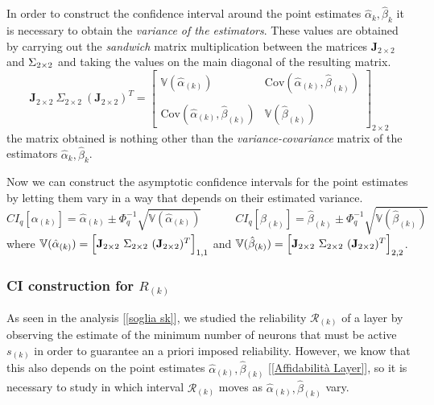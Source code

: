 \documentclass[10pt]{article} %
\begin{document}
In order to construct the confidence interval around the point estimates $\hat{\alpha}_{k}, \hat{\beta}_{k}$ it is necessary to obtain the \textit{variance of the estimators}. These values are obtained by carrying out the \textit{sandwich} matrix multiplication between the matrices $\mathbf{J}_{2\times2}$ and $\large\Sigma_{2\times2}$ and taking the values on the main diagonal of the resulting matrix.
\begin{equation}\label{matriceSandwich}
     \mathbf{J}_{2\times2}\ \Sigma_{2\times2}\ (\mathbf{J}_{2\times2})^{T} =
     \begin{bmatrix}
         \mathbb{V}(\hat{\alpha}_{(k)}) & \text{Cov}(\hat{\alpha}_{(k)}, \hat{\beta}_{(k)}) \\ \\
         \text{Cov}(\hat{\alpha}_{(k)}, \hat{\beta}_{(k)}) & \mathbb{V}(\hat{\beta}_{(k)})
     \end{bmatrix}_{2\times2}
\end{equation}
the matrix obtained is nothing other than the \textit{variance-covariance} matrix of the estimators $\hat{\alpha}_{k}, \hat{\beta}_{k}$. 

Now we can construct the asymptotic confidence intervals for the point estimates by letting them vary in a way that depends on their estimated variance.
\begin{equation}
    CI_{q}[\alpha_{(k)}]
    = \hat{\alpha}_{(k)}\pm \Phi^{-1}_q\sqrt{\mathbb{V}(\hat{\alpha}_{(k)})} \qquad \quad
    CI_{q}[\beta_{(k)}]
    = \hat{\beta}_{(k)}\pm \Phi^{-1}_q\sqrt{\mathbb{V}(\hat{\beta}_{(k)})}
\end{equation}
where $\mathbb{V}(\hat{\alpha}_{(k)}) = \Bigl[\mathbf{J}_{2\times2}\ \Sigma_{2\times2}\ (\mathbf{J}_{2\times2})^{T}\Bigr]_{1,1}$ and $\mathbb{V}(\hat{\beta}_{(k)}) = \Bigl[\mathbf{J}_{2\times2}\ \Sigma_{2\times2}\ (\mathbf{J}_{2\times2})^{T}\Bigr]_{2,2}$.

\subsubsection{CI construction for $R_{(k)}$}
As seen in the analysis [\ref{soglia sk}], we studied the reliability $\mathcal{R}_{(k)}$ of a layer by observing the estimate of the minimum number of neurons that must be active $s_{(k)}$ in order to guarantee an a priori imposed reliability. However, we know that this also depends on the point estimates $\hat{\alpha}_{(k)}, \hat{\beta}_{(k)}$ [\ref{Affidabilità Layer}], so it is necessary to study in which interval $\mathcal{R}_{(k)}$ moves as $\hat{\alpha}_{(k)}, \hat{\beta}_{(k)}$ vary.
\end{document}
